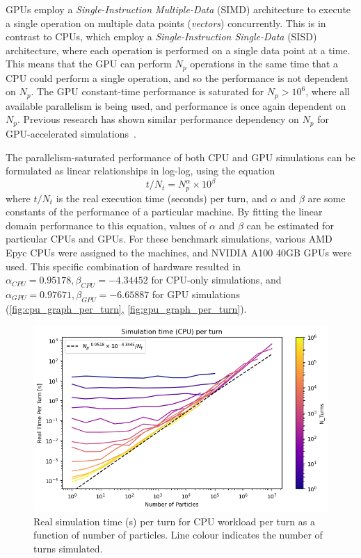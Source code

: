 \documentclass[a4paper,twoside,11pt]{report}
\begin{document}
GPUs employ a \textit{Single-Instruction Multiple-Data} (SIMD) architecture to execute a single operation on multiple data points (\textit{vectors}) concurrently. This is in contrast to CPUs, which employ a \textit{Single-Instruction Single-Data} (SISD) architecture, where each operation is performed on a single data point at a time. This means that the GPU can perform $N_p$ operations in the same time that a CPU could perform a single operation, and so the performance is not dependent on $N_p$. The GPU constant-time performance is saturated for $N_p>10^6$, where all available parallelism is being used, and performance is once again dependent on $N_p$. Previous research has shown similar performance dependency on $N_p$ for GPU-accelerated simulations~\cite{Hegglin:2239398}.

The parallelism-saturated performance of both CPU and GPU simulations can be formulated as linear relationships in log-log, using the equation
\begin{equation}
  t/N_t = N_p^\alpha \times 10^\beta
\end{equation} where $t/N_t$ is the real execution time (seconds) per turn, and $\alpha$ and $\beta$ are some constants of the performance of a particular machine. By fitting the linear domain performance to this equation, values of $\alpha$ and $\beta$ can be estimated for particular CPUs and GPUs. For these benchmark simulations, various AMD Epyc CPUs were assigned to the machines, and NVIDIA A100 40GB GPUs were used. This specific combination of hardware resulted in $\alpha_{CPU} = 0.95178, \beta_{CPU}=-4.34452$ for CPU-only simulations, and $\alpha_{GPU}=0.97671, \beta_{GPU}=-6.65887$ for GPU simulations (\autoref{fig:cpu_graph_per_turn}, \autoref{fig:gpu_graph_per_turn}).

\begin{figure}
  \centering
  \includegraphics*[width=0.77\linewidth]{CPU_graph_per_turn.png}
  \caption[CPU-bound simulation time performance]{Real simulation time (s) per turn for CPU workload per turn as a function of number of particles. Line colour indicates the number of turns simulated.}\label{fig:cpu_graph_per_turn}
\end{figure}
\end{document}
